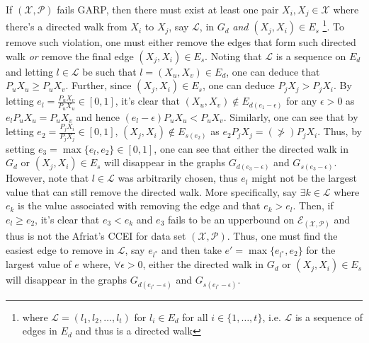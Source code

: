 \documentclass{article} %
\theoremstyle{style1}
\theoremstyle{example}
\begin{document}
If $(\mathcal{X},\mathcal{P})$ fails GARP, then there must exist at least one pair $X_i,X_j\in\mathcal{X}$ where there's a directed walk from $X_i$ to $X_j$, say $\mathcal{L}$, in $G_d$ \emph{and} $(X_j,X_i)\in E_s$ \footnote{where $\mathcal{L}=(l_1,l_2, \ldots, l_t)$ for $l_i\in E_d$ for all $i\in\{1,\ldots,t\}$, i.e. $\mathcal{L}$ is a sequence of edges in $E_d$ and thus is a directed walk}. To remove such violation, one must either remove the edges that form such directed walk \emph{or} remove the final edge $(X_j,X_i)\in E_s$. Noting that $\mathcal{L}$ is a sequence on $E_d$ and letting $l\in\mathcal{L}$ be such that $l=(X_u,X_v)\in E_d$, one can deduce that $P_uX_u\geq P_uX_v$. Further, since $(X_j,X_i)\in E_s$, one can deduce $P_jX_j>P_jX_i$. By letting $e_l=\frac{P_u X_v}{P_uX_u}\in[0,1]$, it's clear that $(X_u,X_v)\not\in E_{d(e_1-\epsilon)}$ for any $\epsilon>0$ as $e_lP_uX_u= P_uX_v$ and hence $(e_l-\epsilon) P_uX_u< P_uX_v$. Similarly, one can see that by letting $e_2=\frac{P_jX_i}{P_jX_j}\in[0,1]$, $(X_j,X_i)\not\in E_{s(e_2)}$ as $e_2 P_jX_j= (\not>) P_jX_i$. Thus, by setting $e_3 = \max\{e_l,e_2\}\in[0,1]$, one can see that either the directed walk in $G_d$ or $(X_j,X_i)\in E_s$ will disappear in the graphs $G_{d(e_3-\epsilon)}$ and $G_{s(e_3-\epsilon)}$. However, note that $l\in\mathcal{L}$ was arbitrarily chosen, thus $e_l$ might not be the largest value that can still remove the directed walk. More specifically, say $\exists k\in\mathcal{L}$ where $e_k$ is the value associated with removing the edge and that $e_k > e_l$. Then, if $e_l \geq e_2$, it's clear that $e_3 < e_k$ and $e_3$ fails to be an upperbound on $\mathcal{E}_{(\mathcal{X},\mathcal{P})}$ and thus is not the Afriat's CCEI for data set $(\mathcal{X},\mathcal{P})$. Thus, one must find the easiest edge to remove in $\mathcal{L}$, say $e_{l^*}$ and then take $e' = \max\{e_{l^*},e_2\}$ for the largest value of $e$ where, $\forall \epsilon>0$, either the directed walk in $G_d$ or $(X_j,X_i)\in E_s$ will disappear in the graphs $G_{d(e_{l^*}-\epsilon)}$ and $G_{s(e_{l^*}-\epsilon)}$. 
\end{document}
